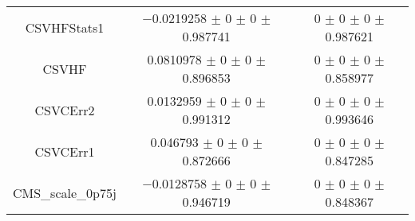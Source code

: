 \begin{table}
\begin{tabular}{ccc}
CSVHFStats1 	& \num{-0.0219258} $\pm$ \num{0} $\pm$ \num{0} $\pm$ \num{0.987741} 	& \num{0} $\pm$ \num{0} $\pm$ \num{0} $\pm$ \num{0.987621}\\
CSVHF 	& \num{0.0810978} $\pm$ \num{0} $\pm$ \num{0} $\pm$ \num{0.896853} 	& \num{0} $\pm$ \num{0} $\pm$ \num{0} $\pm$ \num{0.858977}\\
CSVCErr2 	& \num{0.0132959} $\pm$ \num{0} $\pm$ \num{0} $\pm$ \num{0.991312} 	& \num{0} $\pm$ \num{0} $\pm$ \num{0} $\pm$ \num{0.993646}\\
CSVCErr1 	& \num{0.046793} $\pm$ \num{0} $\pm$ \num{0} $\pm$ \num{0.872666} 	& \num{0} $\pm$ \num{0} $\pm$ \num{0} $\pm$ \num{0.847285}\\
CMS\_scale\_0p75j 	& \num{-0.0128758} $\pm$ \num{0} $\pm$ \num{0} $\pm$ \num{0.946719} 	& \num{0} $\pm$ \num{0} $\pm$ \num{0} $\pm$ \num{0.848367}\\
\bottomrule
\end{tabular}
\end{table}
